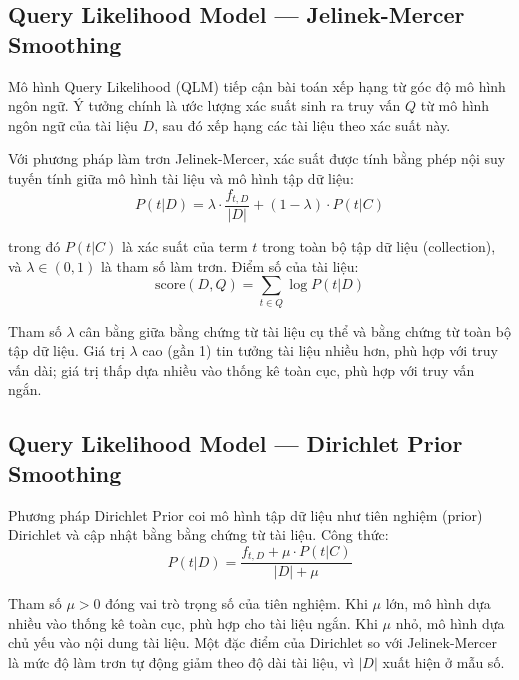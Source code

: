 \documentclass[12pt,a4paper,twoside]{article}
\begin{document}
\subsection{Query Likelihood Model --- Jelinek-Mercer Smoothing}

Mô hình Query Likelihood (QLM) tiếp cận bài toán xếp hạng từ góc độ mô hình ngôn ngữ. Ý tưởng chính là ước lượng xác suất sinh ra truy vấn $Q$ từ mô hình ngôn ngữ của tài liệu $D$, sau đó xếp hạng các tài liệu theo xác suất này.

Với phương pháp làm trơn Jelinek-Mercer, xác suất được tính bằng phép nội suy tuyến tính giữa mô hình tài liệu và mô hình tập dữ liệu:
\begin{equation}
P(t|D) = \lambda \cdot \frac{f_{t,D}}{|D|} + (1 - \lambda) \cdot P(t|C)
\end{equation}

trong đó $P(t|C)$ là xác suất của term $t$ trong toàn bộ tập dữ liệu (collection), và $\lambda \in (0, 1)$ là tham số làm trơn. Điểm số của tài liệu:
\begin{equation}
\text{score}(D, Q) = \sum_{t \in Q} \log P(t|D)
\end{equation}

Tham số $\lambda$ cân bằng giữa bằng chứng từ tài liệu cụ thể và bằng chứng từ toàn bộ tập dữ liệu. Giá trị $\lambda$ cao (gần 1) tin tưởng tài liệu nhiều hơn, phù hợp với truy vấn dài; giá trị thấp dựa nhiều vào thống kê toàn cục, phù hợp với truy vấn ngắn.

\subsection{Query Likelihood Model --- Dirichlet Prior Smoothing}

Phương pháp Dirichlet Prior coi mô hình tập dữ liệu như tiên nghiệm (prior) Dirichlet và cập nhật bằng bằng chứng từ tài liệu. Công thức:
\begin{equation}
P(t|D) = \frac{f_{t,D} + \mu \cdot P(t|C)}{|D| + \mu}
\end{equation}

Tham số $\mu > 0$ đóng vai trò trọng số của tiên nghiệm. Khi $\mu$ lớn, mô hình dựa nhiều vào thống kê toàn cục, phù hợp cho tài liệu ngắn. Khi $\mu$ nhỏ, mô hình dựa chủ yếu vào nội dung tài liệu. Một đặc điểm của Dirichlet so với Jelinek-Mercer là mức độ làm trơn tự động giảm theo độ dài tài liệu, vì $|D|$ xuất hiện ở mẫu số.
\end{document}
